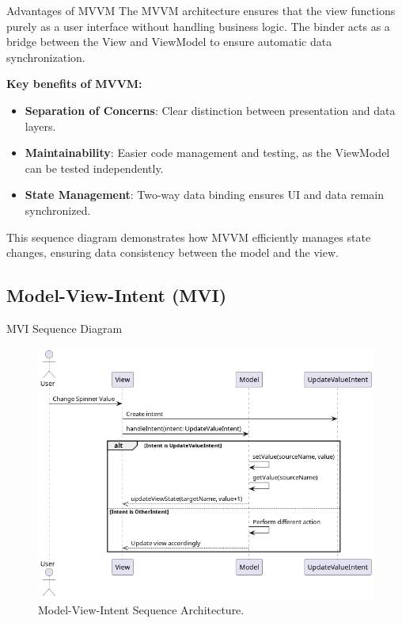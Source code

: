 \documentclass[aspectratio=169, table]{beamer}
\begin{document}
\begin{frame}[fragile]{Advantages of MVVM}
	\vspace{20pt}
	The MVVM architecture ensures that the view functions purely as a user interface without handling business logic. 
	The binder acts as a bridge between the View and ViewModel to ensure automatic data synchronization.
	
	\textbf{Key benefits of MVVM:}
	\begin{itemize}
		\item \textbf{Separation of Concerns}: Clear distinction between presentation and data layers.
		\item \textbf{Maintainability}: Easier code management and testing, as the ViewModel can be tested independently.
		\item \textbf{State Management}: Two-way data binding ensures UI and data remain synchronized.
	\end{itemize}
	
	This sequence diagram demonstrates how MVVM efficiently manages state changes, ensuring data consistency between the model and the view.
\end{frame}



\subsection{Model-View-Intent (MVI)}

\begin{frame}[fragile]{MVI Sequence Diagram}
	\vspace{20pt}
	\begin{figure}[h]
		\centering
		\includegraphics[width=.58\textwidth]{../images/out/mvi-sequence.png}
		\caption{Model-View-Intent Sequence Architecture.}
		\label{fig:mvi-sequence}
	\end{figure}
\end{frame}
\end{document}

